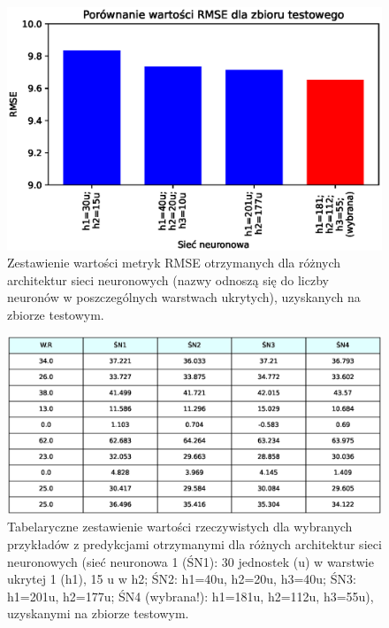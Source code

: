 \documentclass[a4paper,12pt]{article}
\numberwithin{figure}{section}
\begin{document}
    \smallskip

    \begin{figure}[H]
        \centering
        \includegraphics[width=\textwidth]{compr_rmse}
        \caption{Zestawienie wartości metryk RMSE otrzymanych dla różnych architektur sieci neuronowych (nazwy odnoszą się do liczby neuronów w poszczególnych warstwach ukrytych), uzyskanych na zbiorze testowym.}
        \label{fig:compr_rmse}
    \end{figure}

    \smallskip

    \begin{figure}[H]
        \centering
        \includegraphics[width=\textwidth]{table_real_predictions}
        \caption{Tabelaryczne zestawienie wartości rzeczywistych dla wybranych przykładów z predykcjami otrzymanymi dla różnych architektur sieci neuronowych (sieć neuronowa 1 (ŚN1): 30 jednostek (u) w warstwie ukrytej 1 (h1), 15 u w h2; ŚN2: h1=40u, h2=20u, h3=40u; ŚN3: h1=201u, h2=177u; ŚN4 (wybrana!): h1=181u, h2=112u, h3=55u), uzyskanymi na zbiorze testowym.}
        \label{fig:table_real_predictions}
    \end{figure}
\end{document}
